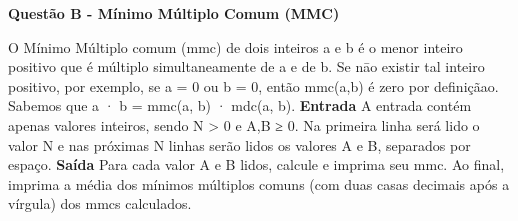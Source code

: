\documentclass[a4paper, 12pt]{article}
\begin{document}
\newpage %
\begin{center}
\textbf{{\Large Questão B - Mínimo Múltiplo Comum (MMC)}}
\end{center}
\vspace{5pt}
O Mínimo Múltiplo comum (mmc) de dois inteiros a e b é o menor inteiro positivo que  é múltiplo simultaneamente de a e de b. Se nāo existir tal inteiro positivo, por exemplo, se a = 0 ou b = 0, então mmc(a,b) é zero por definiçãao. Sabemos que a · b = mmc(a, b) · mdc(a, b).
\newline \newline
\textbf{{\large Entrada}} \newline
A entrada contém apenas valores inteiros, sendo N > 0 e A,B ≥ 0. Na primeira linha será lido o valor N e nas próximas N linhas serão lidos os valores A e B, separados por espaço.
\newline \newline
\textbf{{\large Saída}} \newline
Para cada valor A e B lidos, calcule e imprima seu mmc. Ao final, imprima a média dos mínimos múltiplos comuns (com duas casas decimais após a vírgula) dos mmcs calculados.
\newline
\end{document}
